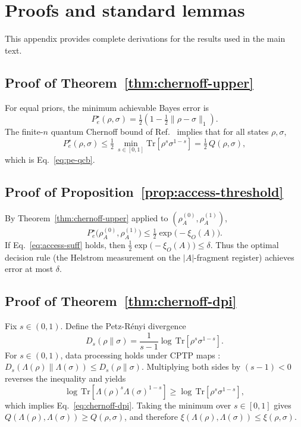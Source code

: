 \documentclass[aps,pra,twocolumn,superscriptaddress,nofootinbib]{revtex4-2}
\newcommand{\1}{\mathbf{1}}
\newcommand{\QCBcoef}{Q}
\newcommand{\QCBdist}{\xi}
\theoremstyle{definition}
\theoremstyle{plain}
\begin{document}
\appendix

\section{Proofs and standard lemmas}

This appendix provides complete derivations for the results used in the main text.

\subsection{Proof of Theorem~\ref{thm:chernoff-upper}}

For equal priors, the minimum achievable Bayes error is
\begin{equation}
P_e^\star(\rho,\sigma)=\tfrac12\left(1-\tfrac12\lVert \rho-\sigma\rVert_1\right).
\end{equation}
The finite-$n$ quantum Chernoff bound of Ref.~\cite{Audenaert2007} implies that for all states $\rho,\sigma$,
\begin{equation}
P_e^\star(\rho,\sigma)\le \tfrac12\,\min_{s\in[0,1]}\mathrm{Tr}[\rho^s\sigma^{1-s}]
=\tfrac12\,\QCBcoef(\rho,\sigma),
\end{equation}
which is Eq.~\eqref{eq:pe-qcb}.

\subsection{Proof of Proposition~\ref{prop:access-threshold}}

By Theorem~\ref{thm:chernoff-upper} applied to $(\rho_A^{(0)},\rho_A^{(1)})$,
\begin{equation}
P_e^\star\bigl(\rho_A^{(0)},\rho_A^{(1)}\bigr)
\le \tfrac12\exp\bigl(-\QCBdist_O(A)\bigr).
\end{equation}
If Eq.~\eqref{eq:access-suff} holds, then
$\tfrac12\exp\bigl(-\QCBdist_O(A)\bigr)\le\delta$.
Thus the optimal decision rule (the Helstrom measurement on the $|A|$-fragment register) achieves error at most $\delta$.

\subsection{Proof of Theorem~\ref{thm:chernoff-dpi}}

Fix $s\in(0,1)$.
Define the Petz-R\'enyi divergence
\begin{equation}
D_s(\rho\|\sigma)=\frac{1}{s-1}\log\,\mathrm{Tr}[\rho^s\sigma^{1-s}].
\end{equation}
For $s\in(0,1)$, data processing holds under CPTP maps \cite{MosonyiOgawa2015,Tomamichel2016}:
$D_s(\Lambda(\rho)\|\Lambda(\sigma))\le D_s(\rho\|\sigma)$.
Multiplying both sides by $(s-1)<0$ reverses the inequality and yields
\begin{equation}
\log\,\mathrm{Tr}[\Lambda(\rho)^s\Lambda(\sigma)^{1-s}]
\ge
\log\,\mathrm{Tr}[\rho^s\sigma^{1-s}],
\end{equation}
which implies Eq.~\eqref{eq:chernoff-dpi}.
Taking the minimum over $s\in[0,1]$ gives
$\QCBcoef(\Lambda(\rho),\Lambda(\sigma))\ge \QCBcoef(\rho,\sigma)$,
and therefore
$\QCBdist(\Lambda(\rho),\Lambda(\sigma))\le \QCBdist(\rho,\sigma)$.
\end{document}
